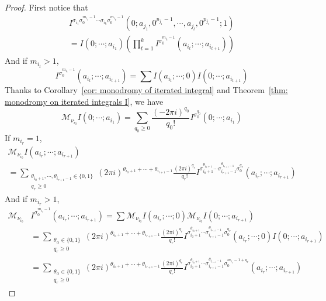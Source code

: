\begin{proof}
First notice that
\begin{multline}\label{eq: depcomposition of an entry in the variation matrix}
I^{\sigma_{i_1}\sigma_0^{m_{i_1}-1}\cdots\sigma_{i_k}\sigma_0^{m_{i_k}-1}}(0;a_{j_1},0^{p_{j_1}-1},\cdots,a_{j_l},0^{p_{j_l}-1};1)\\=I(0;\cdots;a_{i_1})\left(\prod_{t=1}^{k}I^{\sigma_0^{m_{i_t}-1}}(a_{i_t};\cdots;a_{i_{t+1}})\right)
\end{multline}
And if $m_{i_t}>1$,
\begin{equation}
I^{\sigma_0^{m_{i_t}-1}}(a_{i_t};\cdots;a_{i_{t+1}})=\sum I(a_{i_t};\cdots;0)I(0;\cdots;a_{i_{t+1}})
\end{equation}
Thanks to Corollary~\ref{cor: monodromy of iterated integral} and Theorem~\ref{thm: monodromy on iterated integrals I}, we have
\begin{equation}
\mathcal M_{\nu_{i_0}}I(0;\cdots;a_{i_1})=\sum_{q_0\geq0}\frac{(-2\pi i)^{q_0}}{q_0!}I^{\sigma_0^{q_0}}(0;\cdots;a_{i_1})
\end{equation}
If $m_{i_r}=1$,
\begin{multline}
\mathcal M_{\nu_{i_0}}I(a_{i_r};\cdots;a_{i_{r+1}})\\=\sum_{\substack{\theta_{i_0+1},\cdots,\theta_{i_{r+1}-1}\in\{0,1\}\\q_r\geq0}}(2\pi i)^{\theta_{i_0+1}+\cdots+\theta_{i_{r+1}-1}}\frac{(2\pi i)^{q_r}}{q_r!}I^{\sigma_{i_0+1}^{\theta_{i_0+1}}\cdots\sigma_{i_{r+1}-1}^{\theta_{i_{r+1}-1}}\sigma_0^{q_r}}(a_{i_r};\cdots;a_{i_{r+1}})
\end{multline}
And if $m_{i_r}>1$,
\begin{equation}
\begin{aligned}
\mathcal M_{\nu_{i_0}}&I^{\sigma_0^{m_{i_r}-1}}(a_{i_r};\cdots;a_{i_{r+1}})=\sum\mathcal M_{\nu_{i_0}}I(a_{i_r};\cdots;0)\mathcal M_{\nu_{i_0}}I(0;\cdots;a_{i_{r+1}})\\
&=\sum_{\substack{\theta_\alpha\in\{0,1\}\\q_r\geq0}}(2\pi i)^{\theta_{i_0+1}+\cdots+\theta_{i_{r+1}-1}}\frac{(2\pi i)^{q_r}}{q_r!}I^{\sigma_{i_0+1}^{\theta_{i_0+1}}\cdots\sigma_{i_{r+1}-1}^{\theta_{i_{r+1}-1}}\sigma_0^{q_r}}(a_{i_r};\cdots;0)I(0;\cdots;a_{i_{r+1}})\\
&=\sum_{\substack{\theta_\alpha\in\{0,1\}\\q_r\geq0}}(2\pi i)^{\theta_{i_0+1}+\cdots+\theta_{i_{r+1}-1}}\frac{(2\pi i)^{q_r}}{q_r!}I^{\sigma_{i_0+1}^{\theta_{i_0+1}}\cdots\sigma_{i_{r+1}-1}^{\theta_{i_{r+1}-1}}\sigma_0^{m_{i_r}-1+q_r}}(a_{i_r};\cdots;a_{i_{r+1}})

\end{aligned}
\end{equation}
\end{proof}
